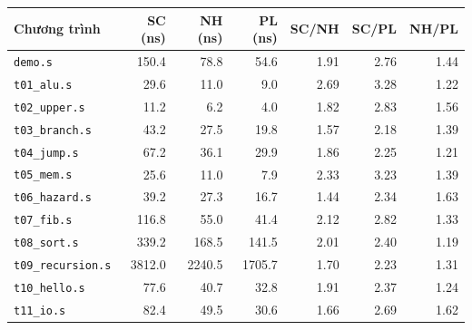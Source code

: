 \begin{tabular}{@{}lrrrrrr@{}}
\toprule
Chương trình & SC (ns) & NH (ns) & PL (ns) & SC/NH & SC/PL & NH/PL \\
\midrule
\texttt{demo.s} & 150.4 & 78.8 & 54.6 & 1.91 & 2.76 & 1.44 \\
\texttt{t01\_alu.s} & 29.6 & 11.0 & 9.0 & 2.69 & 3.28 & 1.22 \\
\texttt{t02\_upper.s} & 11.2 & 6.2 & 4.0 & 1.82 & 2.83 & 1.56 \\
\texttt{t03\_branch.s} & 43.2 & 27.5 & 19.8 & 1.57 & 2.18 & 1.39 \\
\texttt{t04\_jump.s} & 67.2 & 36.1 & 29.9 & 1.86 & 2.25 & 1.21 \\
\texttt{t05\_mem.s} & 25.6 & 11.0 & 7.9 & 2.33 & 3.23 & 1.39 \\
\texttt{t06\_hazard.s} & 39.2 & 27.3 & 16.7 & 1.44 & 2.34 & 1.63 \\
\texttt{t07\_fib.s} & 116.8 & 55.0 & 41.4 & 2.12 & 2.82 & 1.33 \\
\texttt{t08\_sort.s} & 339.2 & 168.5 & 141.5 & 2.01 & 2.40 & 1.19 \\
\texttt{t09\_recursion.s} & 3812.0 & 2240.5 & 1705.7 & 1.70 & 2.23 & 1.31 \\
\texttt{t10\_hello.s} & 77.6 & 40.7 & 32.8 & 1.91 & 2.37 & 1.24 \\
\texttt{t11\_io.s} & 82.4 & 49.5 & 30.6 & 1.66 & 2.69 & 1.62 \\
\bottomrule
\end{tabular}
